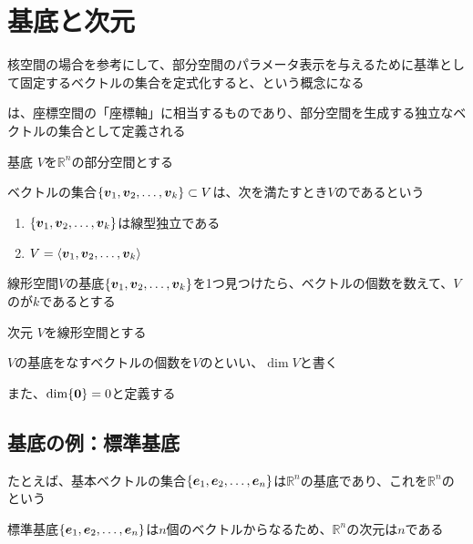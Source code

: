 \documentclass[../../../topic_linear-algebra]{subfiles}
\begin{document}
\sectionline
\section{基底と次元}

核空間の場合を参考にして、部分空間のパラメータ表示を与えるために基準として固定するベクトルの集合を定式化すると、という概念になる

\br

は、座標空間の「座標軸」に相当するものであり、部分空間を生成する独立なベクトルの集合として定義される

\begin{definition}{基底}
  $V$を$\mathbb{R}^n$の部分空間とする

  ベクトルの集合$\{ \vb*{v}_1, \vb*{v}_2, \dots, \vb*{v}_k \} \subset V$は、次を満たすとき$V$のであるという
  \begin{enumerate}[label=\romanlabel]
    \item $\{ \vb*{v}_1, \vb*{v}_2, \dots, \vb*{v}_k \}$は線型独立である
    \item $V = \langle \vb*{v}_1, \vb*{v}_2, \dots, \vb*{v}_k \rangle$
  \end{enumerate}
\end{definition}

線形空間$V$の基底$\{ \vb*{v}_1, \vb*{v}_2, \dots, \vb*{v}_k \}$を1つ見つけたら、ベクトルの個数を数えて、$V$のが$k$であるとする

\begin{definition}{次元}
  $V$を線形空間とする

  $V$の基底をなすベクトルの個数を$V$のといい、$\dim V$と書く

  また、$\dim\{\vb*{0}\} = 0$と定義する
\end{definition}

\subsection{基底の例：標準基底}

たとえば、基本ベクトルの集合$\{ \vb*{e}_1, \vb*{e}_2, \dots, \vb*{e}_n \}$は$\mathbb{R}^n$の基底であり、これを$\mathbb{R}^n$のという

標準基底$\{ \vb*{e}_1, \vb*{e}_2, \dots, \vb*{e}_n \}$は$n$個のベクトルからなるため、$\mathbb{R}^n$の次元は$n$である
\end{document}

